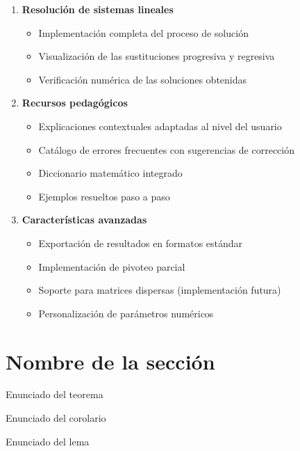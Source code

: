 \begin{enumerate}
	\item \textbf{Resolución de sistemas lineales}
	\begin{itemize}
		\item Implementación completa del proceso de solución
		\item Visualización de las sustituciones progresiva y regresiva
		\item Verificación numérica de las soluciones obtenidas
	\end{itemize}
	
	\item \textbf{Recursos pedagógicos}
	\begin{itemize}
		\item Explicaciones contextuales adaptadas al nivel del usuario
		\item Catálogo de errores frecuentes con sugerencias de corrección
		\item Diccionario matemático integrado
		\item Ejemplos resueltos paso a paso
	\end{itemize}
	
	\item \textbf{Características avanzadas}
	\begin{itemize}
		\item Exportación de resultados en formatos estándar
		\item Implementación de pivoteo parcial
		\item Soporte para matrices dispersas (implementación futura)
		\item Personalización de parámetros numéricos
	\end{itemize}
\end{enumerate}

\section{Nombre de la sección}\label{EtiquetaDeSeccion21}
\noindent
\begin{thm}
	Enunciado del teorema
\end{thm}

\begin{cor}
	Enunciado del corolario
\end{cor}

\begin{lem}
	Enunciado del lema
\end{lem}

